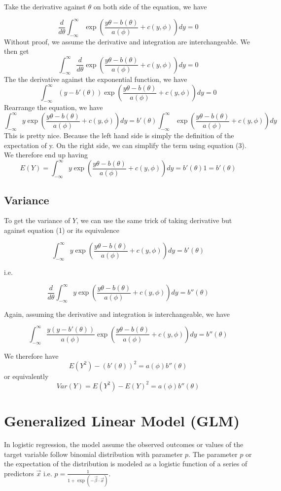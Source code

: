 \documentclass[12pt, oneside]{article}
\begin{document}
Take the derivative against $\theta$ on both side of the equation, we have

$$\frac{d}{d\theta}\int_{-\infty}^{\infty}\exp{\left(\frac{y\theta-b(\theta)}{a(\phi)}+c(y, \phi)\right)}dy=0$$
Without proof, we assume the derivative and integration are interchangeable. We then get
$$\int_{-\infty}^{\infty}\frac{d}{d\theta}\exp{\left(\frac{y\theta-b(\theta)}{a(\phi)}+c(y, \phi)\right)}dy=0$$
The the derivative against the exponential function, we have 
$$\int_{-\infty}^{\infty}(y-b'(\theta))\exp{\left(\frac{y\theta-b(\theta)}{a(\phi)}+c(y, \phi)\right)}dy=0$$ 
Rearrange the equation, we have 
$$\int_{-\infty}^{\infty}y\exp{\left(\frac{y\theta-b(\theta)}{a(\phi)}+c(y, \phi)\right)}dy=b'(\theta)\int_{-\infty}^{\infty}\exp{\left(\frac{y\theta-b(\theta)}{a(\phi)}+c(y, \phi)\right)}dy$$
This is pretty nice. Because the left hand side is simply the definition of the expectation of y. On the right side, we can simplify the term using equation (3). We therefore end up having
$$E(Y)=\int_{-\infty}^{\infty}y\exp{\left(\frac{y\theta-b(\theta)}{a(\phi)}+c(y, \phi)\right)}dy=b'(\theta)1=b'(\theta)$$

\subsection{Variance}
To get the variance of $Y$, we can use the same trick of taking derivative but against equation (1) or its equivalence

$$\int_{-\infty}^{\infty}y\exp{\left(\frac{y\theta-b(\theta)}{a(\phi)}+c(y, \phi)\right)}dy=b'(\theta)$$

i.e.

$$\frac{d}{d\theta}\int_{-\infty}^{\infty}y\exp{\left(\frac{y\theta-b(\theta)}{a(\phi)}+c(y, \phi)\right)}dy=b''(\theta)$$

Again, assuming the derivative and integration is interchangeable, we have

$$\int_{-\infty}^{\infty}\frac{y(y-b'(\theta))}{a(\phi)}\exp{\left(\frac{y\theta-b(\theta)}{a(\phi)}+c(y, \phi)\right)}dy=b''(\theta)$$

We therefore have 
$$E(Y^2)-(b'(\theta))^2=a(\phi)b''(\theta)$$ 
or equivalently
$$Var(Y)=E(Y^2)-E(Y)^2=a(\phi)b''(\theta)$$ 

\section{Generalized Linear Model (GLM)}
In logistic regression, the model assume the observed outcomes or values of the target variable follow binomial distribution with  parameter $p$. The parameter $p$ or the expectation of the distribution is modeled as a logistic function of a series of predictors $\vec{x}$ i.e. $p=\frac{1}{1+\exp(-\vec{\beta}\cdot\vec{x})}$. 
\end{document}
